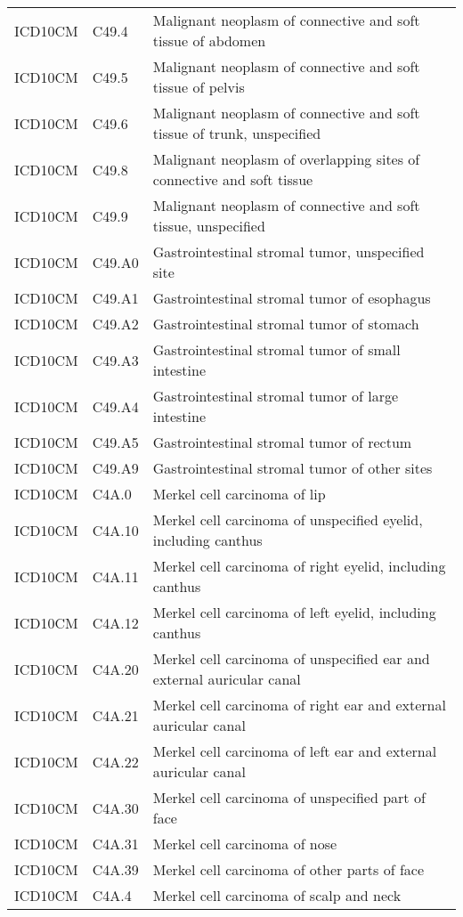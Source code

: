 \begin{longtable}{p{}p{}p{}}
  ICD10CM & C49.4 & Malignant neoplasm of connective and soft tissue of abdomen \\ 
  ICD10CM & C49.5 & Malignant neoplasm of connective and soft tissue of pelvis \\ 
  ICD10CM & C49.6 & Malignant neoplasm of connective and soft tissue of trunk, unspecified \\ 
  ICD10CM & C49.8 & Malignant neoplasm of overlapping sites of connective and soft tissue \\ 
  ICD10CM & C49.9 & Malignant neoplasm of connective and soft tissue, unspecified \\ 
  ICD10CM & C49.A0 & Gastrointestinal stromal tumor, unspecified site \\ 
  ICD10CM & C49.A1 & Gastrointestinal stromal tumor of esophagus \\ 
  ICD10CM & C49.A2 & Gastrointestinal stromal tumor of stomach \\ 
  ICD10CM & C49.A3 & Gastrointestinal stromal tumor of small intestine \\ 
  ICD10CM & C49.A4 & Gastrointestinal stromal tumor of large intestine \\ 
  ICD10CM & C49.A5 & Gastrointestinal stromal tumor of rectum \\ 
  ICD10CM & C49.A9 & Gastrointestinal stromal tumor of other sites \\ 
  ICD10CM & C4A.0 & Merkel cell carcinoma of lip \\ 
  ICD10CM & C4A.10 & Merkel cell carcinoma of unspecified eyelid, including canthus \\ 
  ICD10CM & C4A.11 & Merkel cell carcinoma of right eyelid, including canthus \\ 
  ICD10CM & C4A.12 & Merkel cell carcinoma of left eyelid, including canthus \\ 
  ICD10CM & C4A.20 & Merkel cell carcinoma of unspecified ear and external auricular canal \\ 
  ICD10CM & C4A.21 & Merkel cell carcinoma of right ear and external auricular canal \\ 
  ICD10CM & C4A.22 & Merkel cell carcinoma of left ear and external auricular canal \\ 
  ICD10CM & C4A.30 & Merkel cell carcinoma of unspecified part of face \\ 
  ICD10CM & C4A.31 & Merkel cell carcinoma of nose \\ 
  ICD10CM & C4A.39 & Merkel cell carcinoma of other parts of face \\ 
  ICD10CM & C4A.4 & Merkel cell carcinoma of scalp and neck \\ 

\end{longtable}
